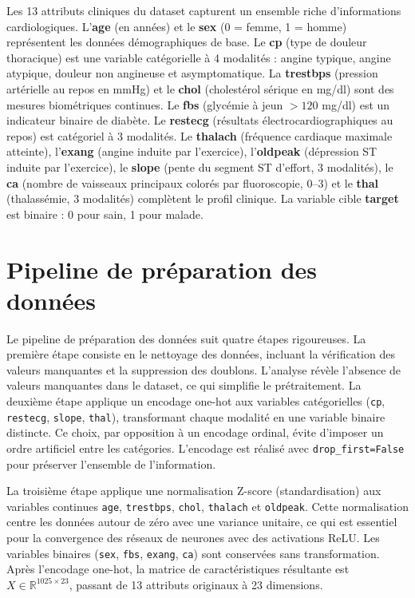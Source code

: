 \documentclass[12pt,a4paper]{report}
\begin{document}
Les 13 attributs cliniques du dataset capturent un ensemble riche d'informations cardiologiques. L'\textbf{age} (en ann\'{e}es) et le \textbf{sex} (0 = femme, 1 = homme) repr\'{e}sentent les donn\'{e}es d\'{e}mographiques de base. Le \textbf{cp} (type de douleur thoracique) est une variable cat\'{e}gorielle \`{a} 4 modalit\'{e}s : angine typique, angine atypique, douleur non angineuse et asymptomatique. La \textbf{trestbps} (pression art\'{e}rielle au repos en mmHg) et le \textbf{chol} (cholest\'{e}rol s\'{e}rique en mg/dl) sont des mesures biom\'{e}triques continues. Le \textbf{fbs} (glyc\'{e}mie \`{a} jeun $> 120$ mg/dl) est un indicateur binaire de diab\`{e}te. Le \textbf{restecg} (r\'{e}sultats \'{e}lectrocardiographiques au repos) est cat\'{e}goriel \`{a} 3 modalit\'{e}s. Le \textbf{thalach} (fr\'{e}quence cardiaque maximale atteinte), l'\textbf{exang} (angine induite par l'exercice), l'\textbf{oldpeak} (d\'{e}pression ST induite par l'exercice), le \textbf{slope} (pente du segment ST d'effort, 3 modalit\'{e}s), le \textbf{ca} (nombre de vaisseaux principaux color\'{e}s par fluoroscopie, 0--3) et le \textbf{thal} (thalass\'{e}mie, 3 modalit\'{e}s) compl\`{e}tent le profil clinique. La variable cible \textbf{target} est binaire : 0 pour sain, 1 pour malade.

\section{Pipeline de pr\'{e}paration des donn\'{e}es}

Le pipeline de pr\'{e}paration des donn\'{e}es suit quatre \'{e}tapes rigoureuses. La premi\`{e}re \'{e}tape consiste en le nettoyage des donn\'{e}es, incluant la v\'{e}rification des valeurs manquantes et la suppression des doublons. L'analyse r\'{e}v\`{e}le l'absence de valeurs manquantes dans le dataset, ce qui simplifie le pr\'{e}traitement. La deuxi\`{e}me \'{e}tape applique un encodage one-hot aux variables cat\'{e}gorielles (\texttt{cp}, \texttt{restecg}, \texttt{slope}, \texttt{thal}), transformant chaque modalit\'{e} en une variable binaire distincte. Ce choix, par opposition \`{a} un encodage ordinal, \'{e}vite d'imposer un ordre artificiel entre les cat\'{e}gories. L'encodage est r\'{e}alis\'{e} avec \texttt{drop\_first=False} pour pr\'{e}server l'ensemble de l'information.

La troisi\`{e}me \'{e}tape applique une normalisation Z-score (standardisation) aux variables continues \texttt{age}, \texttt{trestbps}, \texttt{chol}, \texttt{thalach} et \texttt{oldpeak}. Cette normalisation centre les donn\'{e}es autour de z\'{e}ro avec une variance unitaire, ce qui est essentiel pour la convergence des r\'{e}seaux de neurones avec des activations ReLU. Les variables binaires (\texttt{sex}, \texttt{fbs}, \texttt{exang}, \texttt{ca}) sont conserv\'{e}es sans transformation. Apr\`{e}s l'encodage one-hot, la matrice de caract\'{e}ristiques r\'{e}sultante est $X \in \mathbb{R}^{1025 \times 23}$, passant de 13 attributs originaux \`{a} 23 dimensions.
\end{document}

